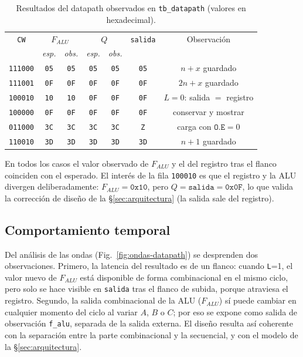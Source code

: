 \documentclass[llncs]{llncs}
\begin{document}
\begin{table}[t]
  \centering
  \caption{Resultados del datapath observados en \texttt{tb\_datapath}
  (valores en hexadecimal).}
  \label{tab:res-cw}
  \footnotesize
  \begin{tabular}{ccccccc}
    \hline
    \texttt{CW} & \multicolumn{2}{c}{$F_{ALU}$} &
      \multicolumn{2}{c}{$Q$} & \texttt{salida} & Observación \\
    & \emph{esp.} & \emph{obs.} & \emph{esp.} & \emph{obs.}
      & & \\
    \hline
    \texttt{111000} & \texttt{05} & \texttt{05} & \texttt{05} &
      \texttt{05} & \texttt{05} & $n+x$ guardado \\
    \texttt{111001} & \texttt{0F} & \texttt{0F} & \texttt{0F} &
      \texttt{0F} & \texttt{0F} & $2n+x$ guardado \\
    \texttt{100010} & \texttt{10} & \texttt{10} & \texttt{0F} &
      \texttt{0F} & \texttt{0F} & $L=0$: salida $=$ registro \\
    \texttt{100000} & \texttt{0F} & \texttt{0F} & \texttt{0F} &
      \texttt{0F} & \texttt{0F} & conservar y mostrar \\
    \texttt{011000} & \texttt{3C} & \texttt{3C} & \texttt{3C} &
      \texttt{3C} & \texttt{Z} & carga con $\mathtt{O.E}=0$ \\
    \texttt{110010} & \texttt{3D} & \texttt{3D} & \texttt{3D} &
      \texttt{3D} & \texttt{3D} & $n+1$ guardado \\
    \hline
  \end{tabular}
\end{table}

En todos los casos el valor observado de $F_{ALU}$ y el del registro tras
el flanco coinciden con el esperado. El interés de la fila
\texttt{100010} es que el registro y la ALU divergen deliberadamente:
$F_{ALU}=\texttt{0x10}$, pero $Q=\texttt{salida}=\texttt{0x0F}$, lo que
valida la corrección de diseño de la §\ref{sec:arquitectura} (la salida
sale del registro).

\subsection{Comportamiento temporal}

Del análisis de las ondas (Fig.~\ref{fig:ondas-datapath}) se desprenden
dos observaciones. Primero, la latencia del resultado es de un flanco:
cuando \texttt{L}=1, el valor nuevo de $F_{ALU}$ está disponible de forma
combinacional en el mismo ciclo, pero solo se hace visible en \texttt{salida}
tras el flanco de subida, porque atraviesa el registro. Segundo, la salida
combinacional de la ALU ($F_{ALU}$) sí puede cambiar en cualquier momento
del ciclo al variar $A$, $B$ o $C$; por eso se expone como salida de
observación \texttt{f\_alu}, separada de la salida externa. El diseño
resulta así coherente con la separación entre la parte combinacional y la
secuencial, y con el modelo de la §\ref{sec:arquitectura}.
\end{document}
